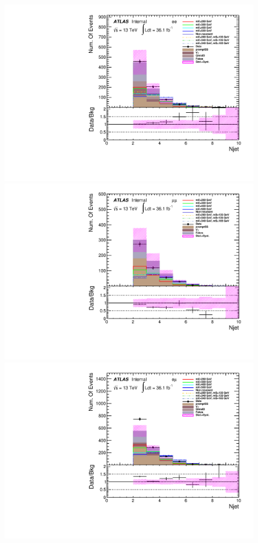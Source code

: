 \begin{figure}[h]
\begin{minipage}[t]{0.33\linewidth}
\centering
\includegraphics[width=1.0\textwidth,angle=-90]{fig/dataMC_low_Njet_CR/numOfjet_ee.pdf}
\end{minipage}
\begin{minipage}[t]{0.33\linewidth}
\centering
\includegraphics[width=1.0\textwidth,angle=-90]{fig/dataMC_low_Njet_CR/numOfjet_mumu.pdf}
\end{minipage}
\begin{minipage}[t]{0.33\linewidth}
\centering
\includegraphics[width=1.0\textwidth,angle=-90]{fig/dataMC_low_Njet_CR/numOfjet_emu.pdf}

\end{minipage}
\end{figure}
